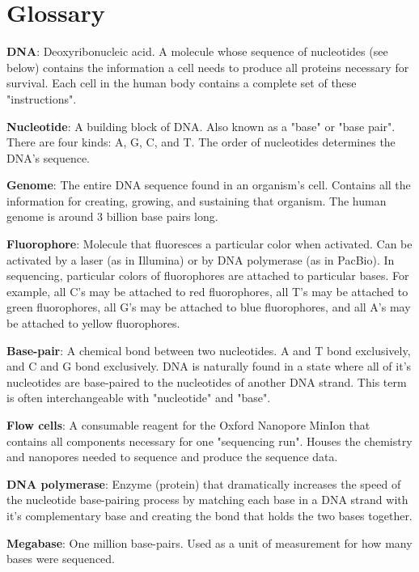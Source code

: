 \documentclass[12pt,letterpaper]{report}
\begin{document}
\section{Glossary}

\textbf{DNA}: Deoxyribonucleic acid. A molecule whose sequence of nucleotides (see below) contains the information a cell needs to produce all proteins necessary for survival. Each cell in the human body contains a complete set of these "instructions". 

\textbf{Nucleotide}: A building block of DNA. Also known as a "base" or "base pair". There are four kinds: A, G, C, and T. The order of nucleotides determines the DNA's sequence.

\textbf{Genome}: The entire DNA sequence found in an organism's cell. Contains all the information for creating, growing, and sustaining that organism. The human genome is around 3 billion base pairs long. 

\textbf{Fluorophore}: Molecule that fluoresces a particular color when activated. Can be activated by a laser (as in Illumina) or by DNA polymerase (as in PacBio). In sequencing, particular colors of fluorophores are attached to particular bases. For example, all C's may be attached to red fluorophores, all T's may be attached to green fluorophores, all G's may be attached to blue fluorophores, and all A's may be attached to yellow fluorophores. 

\textbf{Base-pair}: A chemical bond between two nucleotides. A and T bond exclusively, and C and G bond exclusively. DNA is naturally found in a state where all of it's nucleotides are base-paired to the nucleotides of another DNA strand. This term is often interchangeable with "nucleotide" and "base". 

\textbf{Flow cells}: A consumable reagent for the Oxford Nanopore MinIon that contains all components necessary for one "sequencing run". Houses the chemistry and nanopores needed to sequence  and produce the sequence data.

\textbf{DNA polymerase}: Enzyme (protein) that dramatically increases the speed of the nucleotide base-pairing process by matching each base in a DNA strand with it's complementary base and creating the bond that holds the two bases together. 

\textbf{Megabase}: One million base-pairs. Used as a unit of measurement for how many bases were sequenced. 

\clearpage
\end{document}
